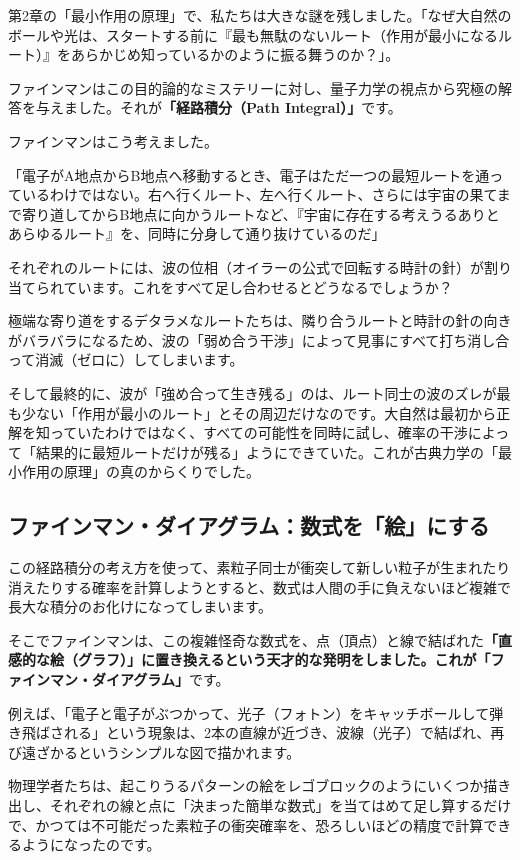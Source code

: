第2章の「最小作用の原理」で、私たちは大きな謎を残しました。「なぜ大自然のボールや光は、スタートする前に『最も無駄のないルート（作用が最小になるルート）』をあらかじめ知っているかのように振る舞うのか？」。

ファインマンはこの目的論的なミステリーに対し、量子力学の視点から究極の解答を与えました。それが\textbf{「経路積分（Path Integral）」}です。

ファインマンはこう考えました。

「電子がA地点からB地点へ移動するとき、電子はただ一つの最短ルートを通っているわけではない。右へ行くルート、左へ行くルート、さらには宇宙の果てまで寄り道してからB地点に向かうルートなど、『宇宙に存在する考えうるありとあらゆるルート』を、同時に分身して通り抜けているのだ」

それぞれのルートには、波の位相（オイラーの公式で回転する時計の針）が割り当てられています。これをすべて足し合わせるとどうなるでしょうか？

極端な寄り道をするデタラメなルートたちは、隣り合うルートと時計の針の向きがバラバラになるため、波の「弱め合う干渉」によって見事にすべて打ち消し合って消滅（ゼロに）してしまいます。

そして最終的に、波が「強め合って生き残る」のは、ルート同士の波のズレが最も少ない「作用が最小のルート」とその周辺だけなのです。大自然は最初から正解を知っていたわけではなく、すべての可能性を同時に試し、確率の干渉によって「結果的に最短ルートだけが残る」ようにできていた。これが古典力学の「最小作用の原理」の真のからくりでした。

\subsection{ファインマン・ダイアグラム：数式を「絵」にする}

この経路積分の考え方を使って、素粒子同士が衝突して新しい粒子が生まれたり消えたりする確率を計算しようとすると、数式は人間の手に負えないほど複雑で長大な積分のお化けになってしまいます。

そこでファインマンは、この複雑怪奇な数式を、点（頂点）と線で結ばれた\textbf{「直感的な絵（グラフ）」に置き換えるという天才的な発明をしました。これが「ファインマン・ダイアグラム」}です。

例えば、「電子と電子がぶつかって、光子（フォトン）をキャッチボールして弾き飛ばされる」という現象は、2本の直線が近づき、波線（光子）で結ばれ、再び遠ざかるというシンプルな図で描かれます。

物理学者たちは、起こりうるパターンの絵をレゴブロックのようにいくつか描き出し、それぞれの線と点に「決まった簡単な数式」を当てはめて足し算するだけで、かつては不可能だった素粒子の衝突確率を、恐ろしいほどの精度で計算できるようになったのです。

